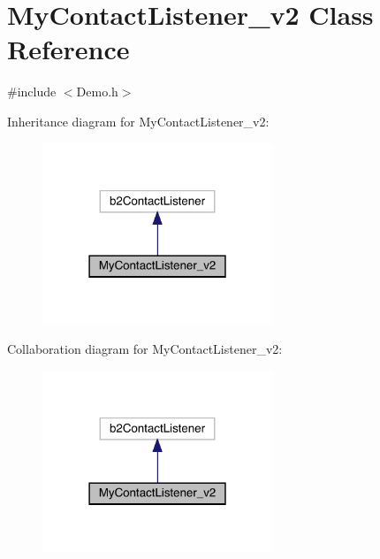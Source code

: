 \hypertarget{class_my_contact_listener__v2}{}\section{My\+Contact\+Listener\+\_\+v2 Class Reference}
\label{class_my_contact_listener__v2}


{\ttfamily \#include $<$Demo.\+h$>$}



Inheritance diagram for My\+Contact\+Listener\+\_\+v2\+:\nopagebreak
\begin{figure}[H]
\begin{center}
\leavevmode
\includegraphics[width=195pt]{class_my_contact_listener__v2__inherit__graph}
\end{center}
\end{figure}


Collaboration diagram for My\+Contact\+Listener\+\_\+v2\+:\nopagebreak
\begin{figure}[H]
\begin{center}
\leavevmode
\includegraphics[width=195pt]{class_my_contact_listener__v2__coll__graph}
\end{center}
\end{figure}

